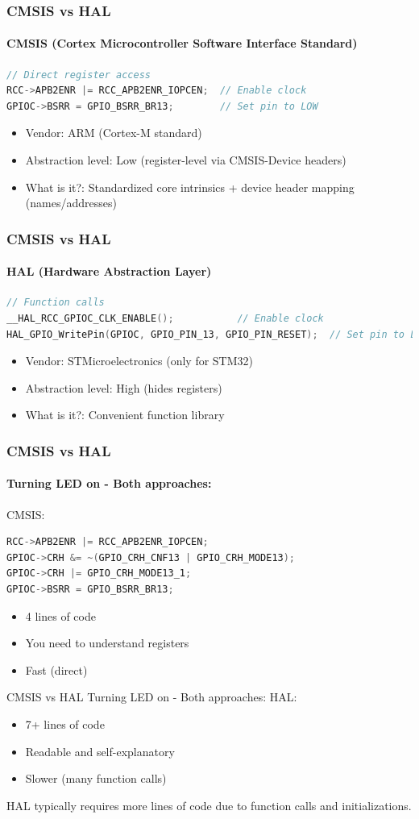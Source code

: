 \documentclass{beamer}
\begin{document}
\begin{frame}[fragile]
	\frametitle{CMSIS vs HAL}
	\framesubtitle{CMSIS (Cortex Microcontroller Software Interface Standard)}
	\begin{lstlisting}[language=C]
// Direct register access
RCC->APB2ENR |= RCC_APB2ENR_IOPCEN;  // Enable clock
GPIOC->BSRR = GPIO_BSRR_BR13;        // Set pin to LOW
	\end{lstlisting}
	\begin{itemize}
		\item Vendor: ARM (Cortex-M standard)
		\item Abstraction level: Low (register-level via CMSIS-Device headers)
		\item What is it?: Standardized core intrinsics + device header mapping (names/addresses)
	\end{itemize}
\end{frame}
\begin{frame}[fragile]
	\frametitle{CMSIS vs HAL}
	\framesubtitle{HAL (Hardware Abstraction Layer)}
	\begin{lstlisting}[language=C]
// Function calls
__HAL_RCC_GPIOC_CLK_ENABLE();           // Enable clock
HAL_GPIO_WritePin(GPIOC, GPIO_PIN_13, GPIO_PIN_RESET);  // Set pin to LOW
	\end{lstlisting}
	\begin{itemize}
		\item Vendor: STMicroelectronics (only for STM32)
		\item Abstraction level: High (hides registers)
		\item What is it?: Convenient function library
	\end{itemize}
\end{frame}
\begin{frame}[fragile]
	\frametitle{CMSIS vs HAL}
	\framesubtitle{Turning LED on - Both approaches:}
	CMSIS:
	\begin{lstlisting}[language=C]
RCC->APB2ENR |= RCC_APB2ENR_IOPCEN;
GPIOC->CRH &= ~(GPIO_CRH_CNF13 | GPIO_CRH_MODE13);
GPIOC->CRH |= GPIO_CRH_MODE13_1;
GPIOC->BSRR = GPIO_BSRR_BR13;
	\end{lstlisting}
	\begin{itemize}
		\item 4 lines of code
		\item You need to understand registers
		\item Fast (direct)
	\end{itemize}
\end{frame}
\begin{frame}{CMSIS vs HAL}
	{Turning LED on - Both approaches:}
	HAL:
	\begin{itemize}
		\item 7+ lines of code
		\item Readable and self-explanatory
		\item Slower (many function calls)
	\end{itemize}
	\vspace{0.2cm}
	HAL typically requires more lines of code due to function calls and initializations.
\end{frame}
\end{document}
